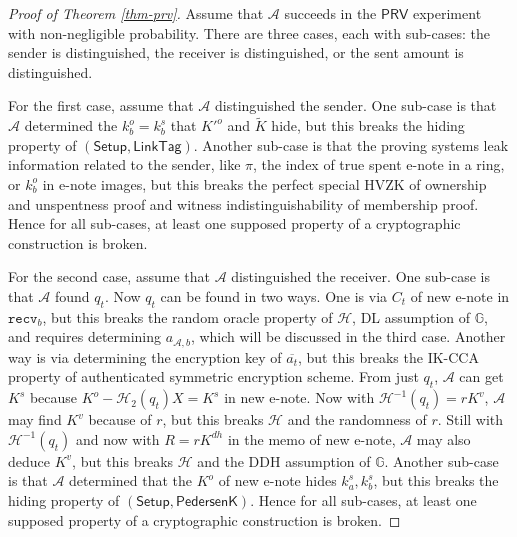 \documentclass{article}
\begin{document}
\begin{proof}[Proof of Theorem \ref{thm-prv}]
Assume that $\mathcal{A}$ succeeds in the $\textsf{PRV}$ experiment with non-negligible probability. There are three cases, each with sub-cases: the sender is distinguished, the receiver is distinguished, or the sent amount is distinguished.

For the first case, assume that $\mathcal{A}$ distinguished the sender. One sub-case is that $\mathcal{A}$ determined the $k_b^o = k_b^s$ that $K'^o$ and $\tilde{K}$ hide, but this breaks the hiding property of $(\textsf{Setup}, \textsf{LinkTag})$. Another sub-case is that the proving systems leak information related to the sender, like $\pi$, the index of true spent e-note in a ring, or $k_b^o$ in e-note images, but this breaks the perfect special HVZK of ownership and unspentness proof and witness indistinguishability of membership proof. Hence for all sub-cases, at least one supposed property of a cryptographic construction is broken.

For the second case, assume that $\mathcal{A}$ distinguished the receiver. One sub-case is that $\mathcal{A}$ found $q_t$. Now $q_t$ can be found in two ways. One is via $C_t$ of new e-note in $\texttt{recv}_b$, but this breaks the random oracle property of  $\mathcal{H}$, DL assumption of $\mathbb{G}$, and requires determining $a_{\mathcal{A},b}$, which will be discussed in the third case. Another way is via determining the encryption key of $\overline{a_t}$, but this breaks the IK-CCA property of authenticated symmetric encryption scheme. From just $q_t$, $\mathcal{A}$ can get $K^s$ because $K^o - \mathcal{H}_2(q_t)X = K^s$ in new e-note. Now with $\mathcal{H}^{-1}(q_t) = r K^{v}$, $\mathcal{A}$ may find $K^v$ because of $r$, but this breaks $\mathcal{H}$ and the randomness of $r$. Still with $\mathcal{H}^{-1}(q_t)$ and now with $R = r K^{dh}$ in the memo of new e-note, $\mathcal{A}$ may also deduce $K^v$, but this breaks $\mathcal{H}$ and the DDH assumption of $\mathbb{G}$. Another sub-case is that $\mathcal{A}$ determined that the $K^o$ of new e-note hides $k_a^s, k_b^s$, but this breaks the hiding property of $(\textsf{Setup}, \textsf{PedersenK})$. Hence for all sub-cases, at least one supposed property of a cryptographic construction is broken.


\end{proof}
\end{document}
